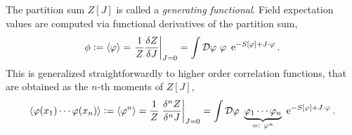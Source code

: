 The partition sum $Z[J]$ is called a \textit{generating functional}. Field expectation values are computed via functional derivatives of the partition sum,
\begin{align}
	\phi := \cf{\varphi} = \eval{\frac{1}{Z}\frac{\delta Z}{\delta J}}_{J=0} = \int \D\varphi \ \varphi \ \operatorname{e}^{-S[\varphi] + J\cdot\varphi}.
\end{align}
This is generalized straightforwardly to higher order correlation functions, that are obtained as the $n$-th moments of $Z[J]$,
\begin{align}
\cf{\varphi(x_1) \cdots \varphi(x_n)} := \cf{\varphi^n} = \frac{1}{Z}\eval{\frac{\delta^n Z}{\delta^n J}}_{J=0} = \int \D\varphi \ \underbrace{\varphi_1 \cdots \varphi_n}_{=: \ \varphi^n} \ \operatorname{e}^{-S[\varphi] + J\cdot\varphi}.
\end{align}

